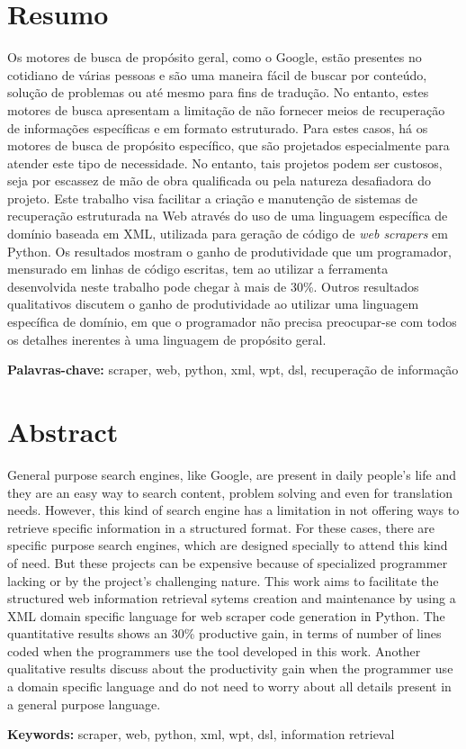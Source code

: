 \cleardoublepage
{}
\chapter*{Resumo}
\thispagestyle{fancy}
Os motores de busca de propósito geral, como o Google, estão presentes no cotidiano de várias pessoas e são uma maneira fácil de buscar por conteúdo, solução de problemas ou até mesmo para fins de tradução. No entanto, estes motores de busca apresentam a limitação de não fornecer meios de recuperação de informações específicas e em formato estruturado. Para estes casos, há os motores de busca de propósito específico, que são projetados especialmente para atender este tipo de necessidade. No entanto, tais projetos podem ser custosos, seja por escassez de mão de obra qualificada ou pela natureza desafiadora do projeto. Este trabalho visa facilitar a criação e manutenção de sistemas de recuperação estruturada na Web através do uso de uma linguagem específica de domínio baseada em XML, utilizada para geração de código de \emph{web scrapers} em Python. Os resultados mostram o ganho de produtividade que um programador, mensurado em linhas de código escritas, tem ao utilizar a ferramenta desenvolvida neste trabalho pode chegar à mais de 30\%. Outros resultados qualitativos discutem o ganho de produtividade ao utilizar uma linguagem específica de domínio, em que o programador não precisa preocupar-se com todos os detalhes inerentes à uma linguagem de propósito geral.
	
	\textbf{Palavras-chave:} scraper, web, python, xml, wpt, dsl, recuperação de informação

\cleardoublepage
{}
\chapter*{Abstract}
\thispagestyle{fancy}
General purpose search engines, like Google, are present in daily people's life and they are an easy way to search content, problem solving and even for translation needs. However, this kind of search engine has a limitation in not offering ways to retrieve specific information in a structured format. For these cases, there are specific purpose search engines, which are designed specially to attend this kind of need. But these projects can be expensive because of specialized programmer lacking or by the project's challenging nature. This work aims to facilitate the structured web information retrieval sytems creation and maintenance by using a XML domain specific language for web scraper code generation in Python. The quantitative results shows an 30\% productive gain, in terms of number of lines coded when the programmers use the tool developed in this work. Another qualitative results discuss about the productivity gain when the programmer use a domain specific language and do not need to worry about all details present in a general purpose language.

	\textbf{Keywords:} scraper, web, python, xml, wpt, dsl, information retrieval
